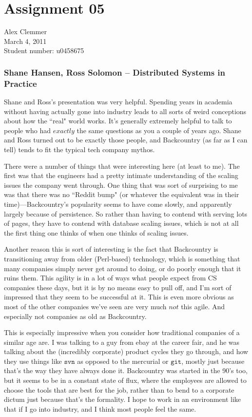 \documentclass[a4paper]{article}
\begin{document}
\section*{Assignment 05}
Alex Clemmer\\
March 4, 2011\\
Student number: u0458675

\subsubsection*{Shane Hansen, Ross Solomon -- Distributed Systems in Practice}

Shane and Ross's presentation was very helpful. Spending years in academia without having actually gone into industry leads to all sorts of weird conceptions about how the ``real" world works. It's generally extremely helpful to talk to people who had $\textit{exactly}$ the same questions as you a couple of years ago. Shane and Ross turned out to be exactly those people, and Backcountry (as far as I can tell) tends to fit the typical tech company mythos.

There were a number of things that were interesting here (at least to me). The first was that the engineers had a pretty intimate understanding of the scaling issues the company went through. One thing that was sort of surprising to me was that there was no ``Reddit bump" (or whatever the equivalent was in their time)---Backcountry's popularity seems to have come slowly, and apparently largely because of persistence. So rather than having to contend with serving lots of pages, they have to contend with database scaling issues, which is not at all the first thing one thinks of when one thinks of scaling issues.

Another reason this is sort of interesting is the fact that Backcountry is transitioning away from older (Perl-based) technology, which is something that many companies simply never get around to doing, or do poorly enough that it ruins them. This agility is in a lot of ways what people expect from CS companies these days, but it is by no means easy to pull off, and I'm sort of impressed that they seem to be successful at it. This is even more obvious as most of the other companies we've seen are very much $\textit{not}$ this agile. And especially not companies as old as Backcountry.

This is especially impressive when you consider how traditional companies of a similar age are. I was talking to a guy from ebay at the career fair, and he was talking about the (incredibly corporate) product cycles they go through, and how they use things like $\texttt{svn}$ as opposed to the  mercurial or $\texttt{git}$, mostly just because that's the way they have always done it. Backcountry was started in the 90's too, but it seems to be in a constant state of flux, where the employees are allowed to choose the tools that are best for the job, rather than to bend to a corporate dictum just because that's the formality. I hope to work in an environment like that if I go into industry, and I think most people feel the same.
\end{document}
